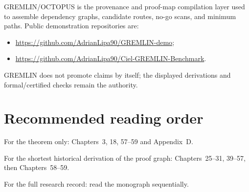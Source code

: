 GREMLIN/OCTOPUS is the provenance and proof-map compilation layer used to
assemble dependency graphs, candidate routes, no-go scans, and minimum paths.
Public demonstration repositories are:

\begin{itemize}
  \item \url{https://github.com/AdrianLipa90/GREMLIN-demo};
  \item \url{https://github.com/AdrianLipa90/Ciel-GREMLIN-Benchmark}.
\end{itemize}

GREMLIN does not promote claims by itself; the displayed derivations and
formal/certified checks remain the authority.

\section*{Recommended reading order}

For the theorem only: Chapters~3, 18, 57--59 and Appendix~D.

For the shortest historical derivation of the proof graph: Chapters~25--31,
39--57, then Chapters~58--59.

For the full research record: read the monograph sequentially.
